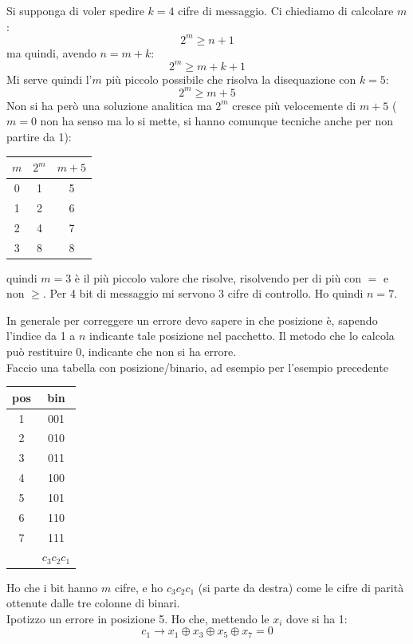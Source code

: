 \documentclass[a4paper,12pt, oneside]{book}
\begin{document}
\begin{esempio}
  Si supponga di voler spedire $k=4$ cifre di messaggio. Ci chiediamo di
  calcolare $m$:
  \[2^m\geq n+1\]
  ma quindi, avendo $n=m+k$:
  \[2^m\geq m+k+1\]
  Mi serve quindi l'$m$ più piccolo possibile che risolva la disequazione con
  $k=5$: 
  \[2^m\geq m+5\]
  Non si ha però una soluzione analitica ma $2^m$ cresce più velocemente di
  $m+5$ ($m=0$ non ha senso ma lo si mette, si hanno comunque tecniche anche per
  non partire da 1):
  \begin{table}[H]
    \centering
    \begin{tabular}{c||c|c}
      $m$& $2^m$ & $m+5$\\
      \hline
      \hline
      0 & 1 & 5\\
      1 & 2 & 6\\
      2 & 4 & 7\\
      3 & 8 & 8
    \end{tabular}
  \end{table}
  quindi $m=3$ è il più piccolo valore che risolve, risolvendo per di più con
  $=$ e non $\geq$. Per 4 bit di messaggio mi servono 3 cifre di controllo. Ho
  quindi $n=7$.
\end{esempio}
In generale per correggere un errore devo sapere in che posizione è, sapendo
l'indice da 1 a $n$ indicante tale posizione nel pacchetto. Il metodo che lo
calcola può restituire 0, indicante che non si ha errore.\\
Faccio una tabella con posizione/binario, ad esempio per l'esempio precedente
\begin{table}[H]
  \centering
  \begin{tabular}{c|c}
    pos& bin \\
    \hline     
    1 & 001\\
    2 & 010\\
    3 &011\\
    4&100\\
    5&101\\
    6&110\\
    7&111\\
    \hline
    \hline
    &   $c_3c_2c_1$
  \end{tabular}
\end{table}
Ho che i bit hanno $m$ cifre, e ho $c_3c_2c_1$ (si parte da destra) come le
cifre di parità ottenute dalle tre colonne di binari.\\
Ipotizzo un errore in posizione 5. Ho che, mettendo le $x_i$ dove si ha 1:
\[c_1\to x_1\oplus x_3\oplus x_5 \oplus x_7=0\]
\end{document}
